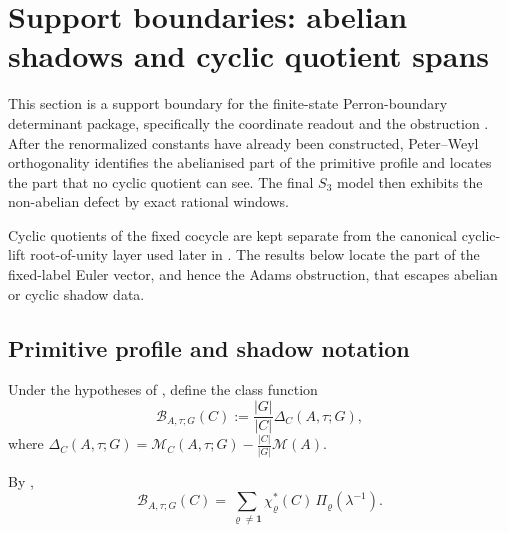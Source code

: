 \section{Support boundaries: abelian shadows and cyclic quotient spans}
\label{sec:shadows}

This section is a support boundary for the finite-state Perron-boundary
determinant package, specifically the coordinate readout
 and the obstruction
.  After the renormalized constants
have already been constructed, Peter--Weyl orthogonality identifies the
abelianised part of the primitive profile and locates the part that no cyclic
quotient can see.  The final \(S_3\) model then exhibits the non-abelian
defect by exact rational windows.

Cyclic quotients of the fixed cocycle are kept separate from the canonical
cyclic-lift root-of-unity layer used later in .  The
results below locate the part of the fixed-label Euler vector, and hence the
Adams obstruction, that escapes abelian or cyclic shadow data.

\subsection{Primitive profile and shadow notation}

\begin{definition}
  \label{def:normalised-primitive-class-profile}
  Under the hypotheses of , define the
  class function
  \[
    \mathcal B_{A,\tau;G}(C):=\frac{|G|}{|C|}\Delta_C(A,\tau;G),
  \]
  where
  \(\Delta_C(A,\tau;G)=\mathcal M_C(A,\tau;G)-\frac{|C|}{|G|}\mathcal M(A)\).
\end{definition}

By ,
\begin{equation}\label{eq:normalised-primitive-class-profile}
  \mathcal B_{A,\tau;G}(C)
  =
  \sum_{\varrho\neq \mathbf 1}
    \chi_\varrho^\ast(C)\,\Pi_\varrho(\lambda^{-1}).
\end{equation}

